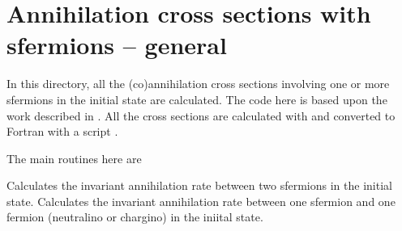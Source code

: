 
\section{Annihilation cross sections with sfermions -- general }

In this directory, all the (co)annihilation cross sections involving
one or more sfermions in the initial state are calculated. The code
here is based upon the work described in \cite{sfcoann}. All the cross
sections are calculated with  and converted to Fortran with
a script  \cite{form2f}. 

The main routines here are

\begin{brief-subs}
  Calculates the invariant annihilation rate between two sfermions in
  the initial state.
  Calculates the invariant annihilation rate between one sfermion and
  one fermion (neutralino or chargino) in the iniital state.
\end{brief-subs}


